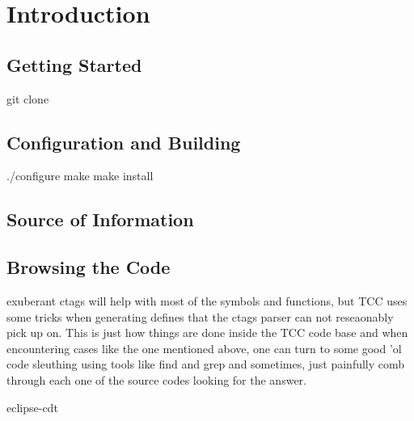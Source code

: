 \chapter{Introduction}

\section{Getting Started}

git clone


\section{Configuration and Building}

./configure
make
make install

\section{Source of Information}

\section{Browsing the Code}


exuberant ctags
will help with most of the symbols and functions, but TCC uses some tricks 
when generating defines that the ctags parser can not reseaonably pick up on. This is just how things 
are done inside the TCC code base and when encountering cases like the one mentioned above,
one can turn to some good 'ol code sleuthing using tools like find and grep and sometimes, 
just painfully comb through each one of the source codes looking for the answer.

eclipse-cdt

